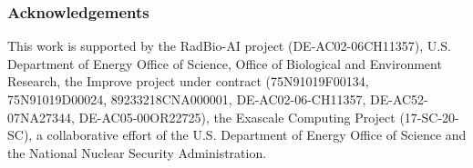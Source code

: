 \subsubsection*{Acknowledgements}


This work is supported by the RadBio-AI project (DE-AC02-06CH11357), U.S. Department of Energy Office of Science, Office of Biological and Environment Research, the Improve project under contract (75N91019F00134, 75N91019D00024, 89233218CNA000001, DE-AC02-06-CH11357, DE-AC52-07NA27344, DE-AC05-00OR22725), 
the Exascale Computing Project (17-SC-20-SC), a collaborative effort of the U.S. Department of Energy Office of Science and the National Nuclear Security Administration.




